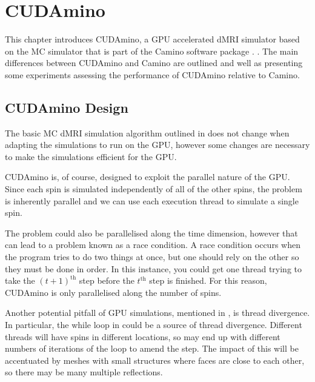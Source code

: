 \chapter{CUDAmino}
\label{sec:cudamino}

\chaptertoc{}

\begin{chapterabstract}
  This chapter introduces CUDAmino, a \ac{GPU} accelerated \ac{dMRI} simulator based on the \ac{MC} simulator that is part of the Camino software package \cite{Cook2006,Hall2009}. .
  The main differences between CUDAmino and Camino are outlined and well as presenting some experiments assessing the performance of CUDAmino relative to Camino.
\end{chapterabstract}


\section{CUDAmino Design}
\label{sec:cudamino_design}
The basic \acl{MC} \ac{dMRI} simulation algorithm outlined in  does not change when adapting the simulations to run on the \ac{GPU}, however some changes are necessary to make the simulations efficient for the \ac{GPU}.

CUDAmino is, of course, designed to exploit the parallel nature of the \ac{GPU}.
Since each spin is simulated independently of all of the other spins, the problem is inherently parallel and we can use each execution thread to simulate a single spin.

The problem could also be parallelised along the time dimension, however that can lead to a problem known as a race condition.
A race condition occurs when the program tries to do two things at once, but one should rely on the other so they must be done in order.
In this instance, you could get one thread trying to take the $(t+1)^{\mathrm{th}}$ step before the $t^{\mathrm{th}}$ step is finished.
For this reason, CUDAmino is only parallelised along the number of spins.

Another potential pitfall of GPU simulations, mentioned in , is thread divergence.
In particular, the while loop in  could be a source of thread divergence.
Different threads will have spins in different locations, so may end up with different numbers of iterations of the loop to amend the step.
The impact of this will be accentuated by meshes with small structures where faces are close to each other, so there may be many multiple reflections.

